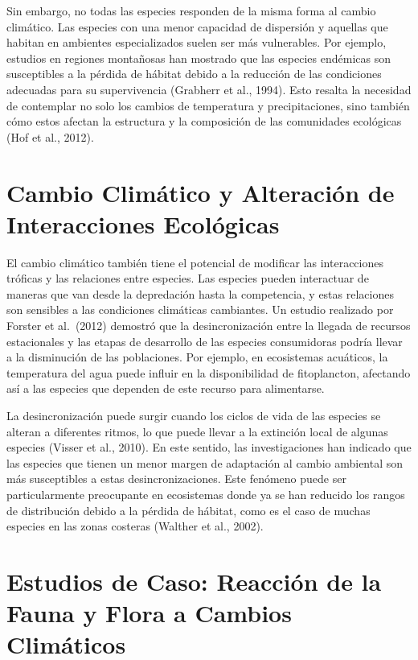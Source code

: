 \documentclass[
  letterpaper,
  DIV=11,
  numbers=noendperiod,
  oneside]{scrreprt}
\begin{document}
Sin embargo, no todas las especies responden de la misma forma al cambio
climático. Las especies con una menor capacidad de dispersión y aquellas
que habitan en ambientes especializados suelen ser más vulnerables. Por
ejemplo, estudios en regiones montañosas han mostrado que las especies
endémicas son susceptibles a la pérdida de hábitat debido a la reducción
de las condiciones adecuadas para su supervivencia (Grabherr et al.,
1994). Esto resalta la necesidad de contemplar no solo los cambios de
temperatura y precipitaciones, sino también cómo estos afectan la
estructura y la composición de las comunidades ecológicas (Hof et al.,
2012).

\section{Cambio Climático y Alteración de Interacciones
Ecológicas}\label{cambio-climuxe1tico-y-alteraciuxf3n-de-interacciones-ecoluxf3gicas}

El cambio climático también tiene el potencial de modificar las
interacciones tróficas y las relaciones entre especies. Las especies
pueden interactuar de maneras que van desde la depredación hasta la
competencia, y estas relaciones son sensibles a las condiciones
climáticas cambiantes. Un estudio realizado por Forster et al.~(2012)
demostró que la desincronización entre la llegada de recursos
estacionales y las etapas de desarrollo de las especies consumidoras
podría llevar a la disminución de las poblaciones. Por ejemplo, en
ecosistemas acuáticos, la temperatura del agua puede influir en la
disponibilidad de fitoplancton, afectando así a las especies que
dependen de este recurso para alimentarse.

La desincronización puede surgir cuando los ciclos de vida de las
especies se alteran a diferentes ritmos, lo que puede llevar a la
extinción local de algunas especies (Visser et al., 2010). En este
sentido, las investigaciones han indicado que las especies que tienen un
menor margen de adaptación al cambio ambiental son más susceptibles a
estas desincronizaciones. Este fenómeno puede ser particularmente
preocupante en ecosistemas donde ya se han reducido los rangos de
distribución debido a la pérdida de hábitat, como es el caso de muchas
especies en las zonas costeras (Walther et al., 2002).

\section{Estudios de Caso: Reacción de la Fauna y Flora a Cambios
Climáticos}\label{estudios-de-caso-reacciuxf3n-de-la-fauna-y-flora-a-cambios-climuxe1ticos}
\end{document}
